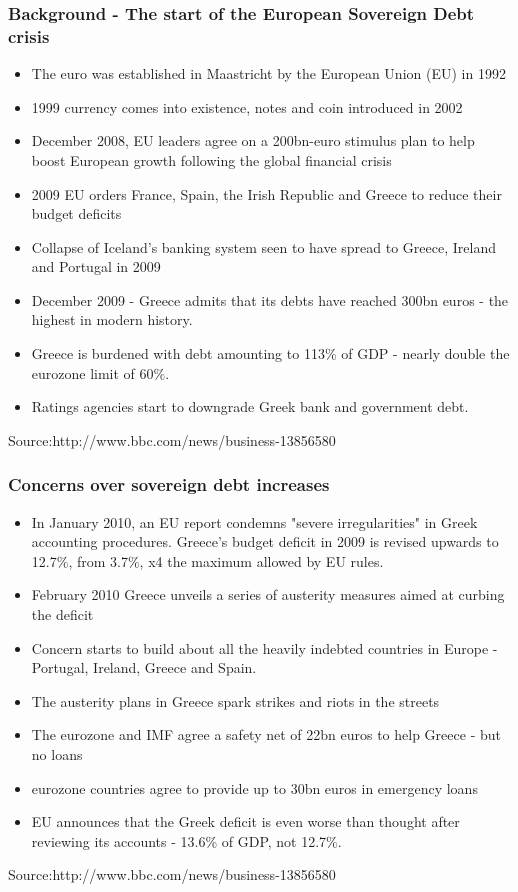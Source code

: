 \documentclass[11pt]{beamer}
\begin{document}
\begin{frame}
\frametitle{Background - The start of the European Sovereign Debt crisis}
\begin{itemize}
\item The euro was established in Maastricht by the European Union (EU) in 1992
\item 1999 currency comes into existence, notes and coin introduced in 2002
\item December 2008, EU leaders agree on a 200bn-euro stimulus plan to help boost European growth following the global financial crisis
\item 2009 EU orders France, Spain, the Irish Republic and Greece to reduce their budget deficits
\item Collapse of Iceland's banking system seen to have spread to Greece, Ireland and Portugal in 2009
\item December 2009 - Greece admits that its debts have reached 300bn euros - the highest in modern history.
\item Greece is burdened with debt amounting to 113$\%$ of GDP - nearly double the eurozone limit of 60$\%$.
\item Ratings agencies start to downgrade Greek bank and government debt.
\end{itemize}
\tiny{Source:http://www.bbc.com/news/business-13856580}
\end{frame}

\begin{frame}
\frametitle{Concerns over sovereign debt increases}
\begin{itemize}
\item In January 2010, an EU report condemns "severe irregularities" in Greek accounting procedures. Greece's budget deficit in 2009 is revised upwards to 12.7$\%$, from 3.7$\%$, x4 the maximum allowed by EU rules.
\item February 2010 Greece unveils a series of austerity measures aimed at curbing the deficit
\item Concern starts to build about all the heavily indebted countries in Europe - Portugal, Ireland, Greece and Spain.
\item The austerity plans in Greece spark strikes and riots in the streets
\item The eurozone and IMF agree a safety net of 22bn euros to help Greece - but no loans
\item eurozone countries agree to provide up to 30bn euros in emergency loans
\item EU announces that the Greek deficit is even worse than thought after reviewing its accounts - 13.6$\%$ of GDP, not 12.7$\%$.
\end{itemize}
\tiny{Source:http://www.bbc.com/news/business-13856580}
\end{frame}
\end{document}
